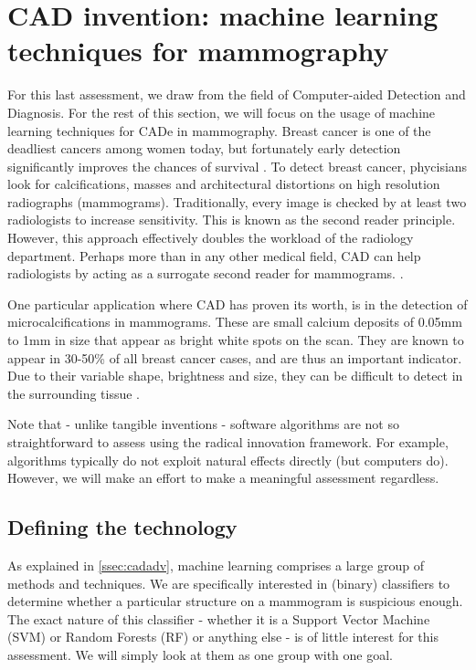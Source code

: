 \section{CAD invention: machine learning techniques for mammography}
For this last assessment, we draw from the field of Computer-aided Detection and
Diagnosis. For the rest of this section, we will focus on the usage of machine
learning techniques for CADe in mammography. Breast cancer is one of the
deadliest cancers among women today, but fortunately early detection
significantly improves the chances of survival \cite{mammoairecent}. To detect
breast cancer, phycisians look for calcifications, masses and architectural
distortions on high resolution radiographs (mammograms). Traditionally, every
image is checked by at least two radiologists to increase sensitivity. This is
known as the second reader principle. However, this approach effectively doubles
the workload of the radiology department. Perhaps more than in any other
medical field, CAD can help radiologists by acting as a surrogate second reader
for mammograms. \cite{mlinmedical}.

One particular application where CAD has proven its worth, is in the detection
of microcalcifications in mammograms. These are small calcium deposits of 0.05mm
to 1mm in size that appear as bright white spots on the scan. They are known to
appear in 30-50\% of all breast cancer cases, and are thus an important
indicator. Due to their variable shape, brightness and size, they can be
difficult to detect in the surrounding tissue \cite{mlinmedical}.

Note that - unlike tangible inventions - software algorithms are not so
straightforward to assess using the radical innovation framework. For example,
algorithms typically do not exploit natural effects directly (but computers do).
However, we will make an effort to make a meaningful assessment regardless.


\subsection{Defining the technology}
As explained in \autoref{ssec:cadadv}, machine learning comprises a large group
of methods and techniques. We are specifically interested in (binary)
classifiers to determine whether a particular structure on a mammogram is
suspicious enough. The exact nature of this classifier - whether it is a Support
Vector Machine (SVM) or Random Forests (RF) or anything else - is of little
interest for this assessment. We will simply look at them as one group with one
goal.

